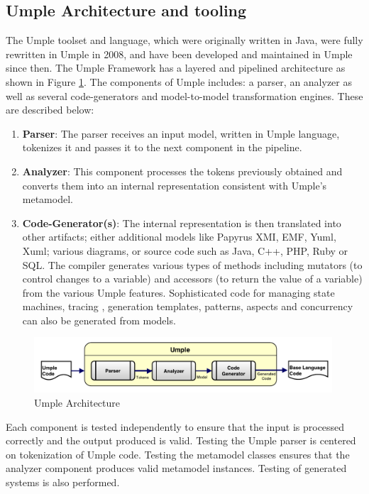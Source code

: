 \subsection{Umple Architecture and tooling}

The Umple toolset and language, which were originally written in Java, were fully rewritten in Umple in 2008, and have been developed and maintained in Umple since then. The Umple Framework has a layered and pipelined architecture as shown in Figure \ref{fig:umpleArchitecture}. 
The components of Umple includes: a parser, an analyzer as well as several code-generators and model-to-model transformation engines. These are described below:

\begin{enumerate}
\item \textbf{Parser}: The parser receives an input model, written in Umple language, tokenizes it and passes it to the next component in the pipeline.

\item \textbf{Analyzer}: This component processes the tokens previously obtained and converts them into an internal representation consistent with Umple's metamodel. 
\item \textbf{Code-Generator(s)}: The internal representation is then translated into other artifacts; either additional models like Papyrus XMI, EMF, Yuml, Xuml; various diagrams, or source code such as Java, C++, PHP, Ruby or SQL. The compiler generates various types of methods including mutators (to control changes to a variable) and accessors (to return the value of a variable) from the various Umple features. Sophisticated code for managing state machines, tracing \cite{UmpleTracing}, generation templates, patterns, aspects and concurrency can also be generated from models.

\end{enumerate}
\begin{figure}[h]
\centering
\includegraphics[width=0.99\textwidth]{Figures/umpleArchitecture.pdf} 
\caption{Umple Architecture}
\label{fig:umpleArchitecture}
\end{figure}

Each component is tested independently to ensure that the input is processed correctly and the output produced is valid. Testing the Umple parser is centered on tokenization of Umple code. Testing the metamodel classes ensures that the analyzer component produces valid metamodel instances. Testing of generated systems is also performed.

